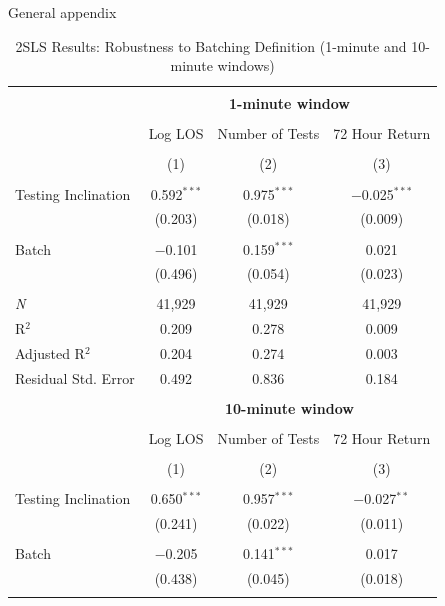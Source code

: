 \documentclass[,,nonblindrev]{informs}
\begin{document}
\begin{APPENDIX}{General appendix}
\newpage

\begin{table}[!htbp] \centering 
  \caption{2SLS Results: Robustness to Batching Definition (1-minute and 10-minute windows)} 
  \label{tab:robustness_batching} 

\begin{tabular}{@{\extracolsep{10pt}}lccc} 
\\[-1.8ex]\hline 
\hline \\[-1.8ex] 
 & \multicolumn{3}{c}{\textbf{1-minute window}} \\
\\[-1.8ex] & Log LOS & Number of Tests & 72 Hour Return \\ 
\\[-1.8ex] & (1) & (2) & (3)\\ 
\hline \\[-1.8ex] 
 Testing Inclination & 0.592$^{***}$ & 0.975$^{***}$ & $-$0.025$^{***}$ \\ 
  & (0.203) & (0.018) & (0.009) \\ 
  & & & \\ 
 Batch & $-$0.101 & 0.159$^{***}$ & 0.021 \\ 
  & (0.496) & (0.054) & (0.023) \\ 
  & & & \\ 
\textit{N} & 41,929 & 41,929 & 41,929 \\ 
R$^{2}$ & 0.209 & 0.278 & 0.009 \\ 
Adjusted R$^{2}$ & 0.204 & 0.274 & 0.003 \\ 
Residual Std. Error & 0.492 & 0.836 & 0.184 \\ 
\hline 
\\[-1.8ex] & \multicolumn{3}{c}{\textbf{10-minute window}} \\
\\[-1.8ex] & Log LOS & Number of Tests & 72 Hour Return \\ 
\\[-1.8ex] & (1) & (2) & (3)\\ 
\hline \\[-1.8ex] 
 Testing Inclination & 0.650$^{***}$ & 0.957$^{***}$ & $-$0.027$^{**}$ \\ 
  & (0.241) & (0.022) & (0.011) \\ 
  & & & \\ 
 Batch & $-$0.205 & 0.141$^{***}$ & 0.017 \\ 
  & (0.438) & (0.045) & (0.018) \\ 
  & & & \\ 

\end{tabular}
\end{table}
\end{APPENDIX}
\end{document}
